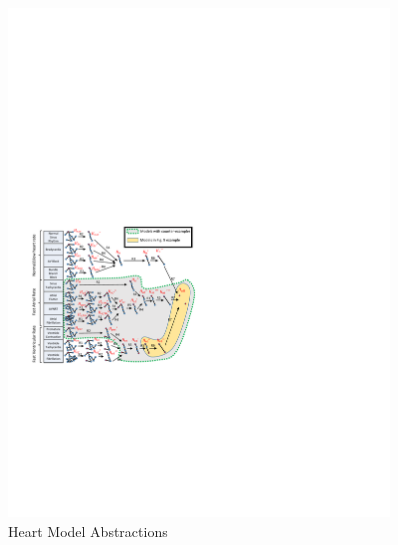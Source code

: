 \begin{figure}[!t]
	\centering
	\includegraphics[width=0.9\textwidth]{figs/abs.pdf}
	\caption{\small Heart Model Abstractions}
	\label{fig:HM_abs}
\end{figure}

